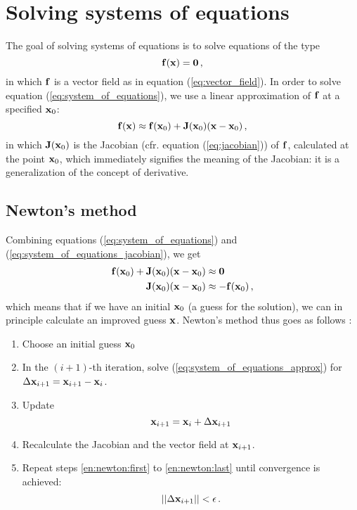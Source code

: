 \section{Solving systems of equations}
    The goal of solving systems of equations is to solve equations of the type
    \begin{equation} \label{eq:system_of_equations}
        \vb{f}(\vb{x}) = \vb{0} \thinspace ,
    \end{equation}
    in which $\vb{f}$ is a vector field as in equation (\ref{eq:vector_field}). In order to solve equation (\ref{eq:system_of_equations}), we use a linear approximation of $\vb{f}$ at a specified $\vb{x}_0$:
    \begin{equation} \label{eq:system_of_equations_jacobian}
        \vb{f}(\vb{x}) \approx \vb{f}(\vb{x}_0) + \vb{J}(\vb{x}_0) (\vb{x} - \vb{x}_0) \thinspace ,
    \end{equation}
    in which $\vb{J}(\vb{x}_0)$ is the Jacobian (cfr. equation (\ref{eq:jacobian})) of $\vb{f}$, calculated at the point $\vb{x}_0$, which immediately signifies the meaning of the Jacobian: it is a generalization of the concept of derivative.

    \subsection{Newton's method}
        Combining equations (\ref{eq:system_of_equations}) and (\ref{eq:system_of_equations_jacobian}), we get
        \begin{align}
            \vb{f}(\vb{x}_0) + \vb{J}(\vb{x}_0) (\vb{x} - \vb{x}_0) &\approx \vb{0} \\
            \vb{J}(\vb{x}_0) (\vb{x} - \vb{x}_0) & \approx - \vb{f}(\vb{x}_0) \label{eq:system_of_equations_approx} \thinspace ,
        \end{align}
        which means that if we have an initial $\vb{x}_0$ (a guess for the solution), we can in principle calculate an improved guess $\vb{x}$. Newton's method thus goes as follows \cite{burden2010}:
        \begin{enumerate}
            \item Choose an initial guess $\vb{x}_0$
            \item \label{en:newton:first} In the $(i+1)$-th iteration, solve (\ref{eq:system_of_equations_approx}) for $\Delta \vb{x}_{i+1} = \vb{x}_{i+1} - \vb{x}_i$.
            \item Update
                \begin{equation}
                    \vb{x}_{i+1} = \vb{x}_i + \Delta \vb{x}_{i+1}
                \end{equation}
            \item \label{en:newton:last} Recalculate the Jacobian and the vector field at $\vb{x}_{i+1}$.
            \item Repeat steps \ref{en:newton:first} to \ref{en:newton:last} until convergence is achieved:
                \begin{equation}
                    || \Delta \vb{x}_{i+1} || < \epsilon \thinspace .
                \end{equation}
        \end{enumerate}

